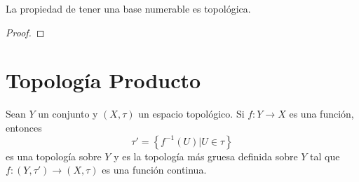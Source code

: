 \documentclass[12pt]{report}
\theoremstyle{largebreak}
\newcommand\cf[3]{\ensuremath{#1:#2\rightarrow#3}}
\begin{document}
    \begin{excer}
        La propiedad de tener una base numerable es topológica.
    \end{excer}

    \begin{proof}
        
    \end{proof}

    \section{Topología Producto}

    \begin{propo}
        Sean $Y$ un conjunto y $(X,\tau)$ un espacio topológico. Si $\cf{f}{Y}{X}$ es una función, entonces
        \begin{equation*}
            \tau'=\left\{f^{-1}(U)\Big|U\in\tau \right\}
        \end{equation*}
        es una topología sobre $Y$ y es la topología más gruesa definida sobre $Y$ tal que $\cf{f}{(Y,\tau')}{(X,\tau)}$ es una función continua.
    \end{propo}
\end{document}
